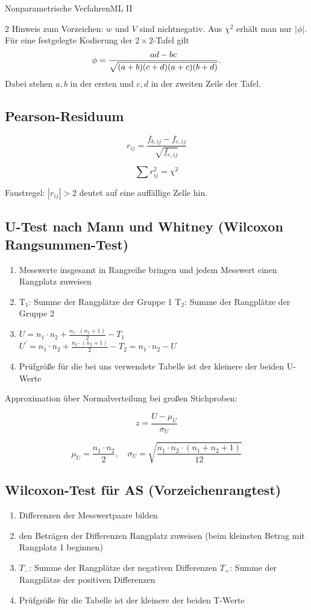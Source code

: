 \begin{formulaBox}{Nonparametrische Verfahren}{ML II}
\begin{multicols}{2}
Hinweis zum Vorzeichen: $w$ und $V$ sind nichtnegativ. Aus $\chi^2$ erhält man nur $|\phi|$. Für eine festgelegte Kodierung der $2\times2$-Tafel gilt
\[
\phi=\frac{ad-bc}{\sqrt{(a+b)(c+d)(a+c)(b+d)}}.
\]
Dabei stehen $a,b$ in der ersten und $c,d$ in der zweiten Zeile der Tafel.

\columnbreak
\subsection*{Pearson-Residuum}

$$r_{ij}=\frac{f_{b,ij}-f_{e,ij}}{\sqrt{f_{e,ij}}}$$

$$\sum r_{ij}^2=\chi^2$$

Faustregel: $|r_{ij}|>2$ deutet auf eine auffällige Zelle hin.

\subsection*{U-Test nach Mann und Whitney (Wilcoxon Rangsummen-Test)}
\begin{enumerate}
    \item Messwerte insgesamt in Rangreihe bringen und jedem Messwert einen Rangplatz zuweisen
    \item T$_1$: Summe der Rangplätze der Gruppe 1
            T$_2$: Summe der Rangplätze der Gruppe 2
    \item $U=n_1\cdot n_2+\frac{n_1\cdot(n_1+1)}{2}-T_1$ \\
            $U^{\prime}=n_1 \cdot n_2+\frac{n_2 \cdot(n_2+1)}{2}-T_2 = n_1 \cdot n_2-U$
    \item Prüfgröße für die bei uns verwendete Tabelle ist der kleinere der beiden U-Werte
\end{enumerate}

Approximation über Normalverteilung bei großen Stichproben:

$$z=\frac{U-\mu_U}{\sigma_U}$$

$$\mu_U=\frac{n_1 \cdot n_2}{2}, \quad \sigma_U=\sqrt{\frac{n_1 \cdot n_2 \cdot (n_1+n_2+1)}{12}}$$

\subsection*{Wilcoxon-Test für AS (Vorzeichenrangtest)}
\begin{enumerate}
    \item Differenzen der Messwertpaare bilden
    \item den Beträgen der Differenzen Rangplatz zuweisen (beim kleinsten Betrag mit Rangplatz 1 beginnen)
    \item $T_-$: Summe der Rangplätze der negativen Differenzen
    $T_+$: Summe der Rangplätze der positiven Differenzen
    \item Prüfgröße für die Tabelle ist der kleinere der beiden T-Werte
\end{enumerate}


\end{multicols}
\end{formulaBox}
